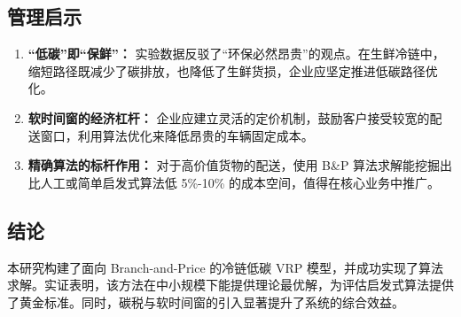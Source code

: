 \documentclass[11pt, a4paper]{article}
\begin{document}
\subsection{管理启示}
\begin{enumerate}
    \item \textbf{“低碳”即“保鲜”：} 实验数据反驳了“环保必然昂贵”的观点。在生鲜冷链中，缩短路径既减少了碳排放，也降低了生鲜货损，企业应坚定推进低碳路径优化。
    \item \textbf{软时间窗的经济杠杆：} 企业应建立灵活的定价机制，鼓励客户接受较宽的配送窗口，利用算法优化来降低昂贵的车辆固定成本。
    \item \textbf{精确算法的标杆作用：} 对于高价值货物的配送，使用 B\&P 算法求解能挖掘出比人工或简单启发式算法低 5\%-10\% 的成本空间，值得在核心业务中推广。
\end{enumerate}

\subsection{结论}
本研究构建了面向 Branch-and-Price 的冷链低碳 VRP 模型，并成功实现了算法求解。实证表明，该方法在中小规模下能提供理论最优解，为评估启发式算法提供了黄金标准。同时，碳税与软时间窗的引入显著提升了系统的综合效益。
\end{document}
